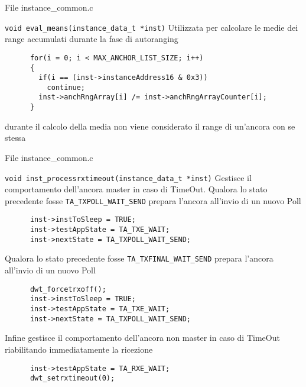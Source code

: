 \begin{frame}[fragile]{File instance\_common.c}
  \begin{block}{\lstinline!void eval_means(instance_data_t *inst)!}
    Utilizzata per calcolare le medie dei range accumulati durante la fase di autoranging
    \begin{lstlisting}
      for(i = 0; i < MAX_ANCHOR_LIST_SIZE; i++)
      {
        if(i == (inst->instanceAddress16 & 0x3))
          continue;
        inst->anchRngArray[i] /= inst->anchRngArrayCounter[i];
      }
    \end{lstlisting}
    durante il calcolo della media \alert{non} viene considerato il range di un'ancora con se stessa
  \end{block}
\end{frame}

\begin{frame}[fragile,shrink=30]{File instance\_common.c}
  \begin{block}{\lstinline!void inst_processrxtimeout(instance_data_t *inst)!}
    Gestisce il comportamento dell'ancora master in caso di TimeOut.
    Qualora lo stato precedente fosse \lstinline!TA_TXPOLL_WAIT_SEND! prepara l'ancora all'invio di un nuovo Poll
    \begin{lstlisting}
      inst->instToSleep = TRUE;
      inst->testAppState = TA_TXE_WAIT;
      inst->nextState = TA_TXPOLL_WAIT_SEND;
    \end{lstlisting}
    Qualora lo stato precedente fosse \lstinline!TA_TXFINAL_WAIT_SEND! prepara l'ancora all'invio di un nuovo Poll    
    \begin{lstlisting}
      dwt_forcetrxoff();
      inst->instToSleep = TRUE;
      inst->testAppState = TA_TXE_WAIT;
      inst->nextState = TA_TXPOLL_WAIT_SEND;
    \end{lstlisting}
    Infine gestisce il comportamento dell'ancora \alert{non} master in caso di TimeOut riabilitando immediatamente la ricezione
    \begin{lstlisting}
      inst->testAppState = TA_RXE_WAIT;
      dwt_setrxtimeout(0);
    \end{lstlisting}
  \end{block}
\end{frame}

